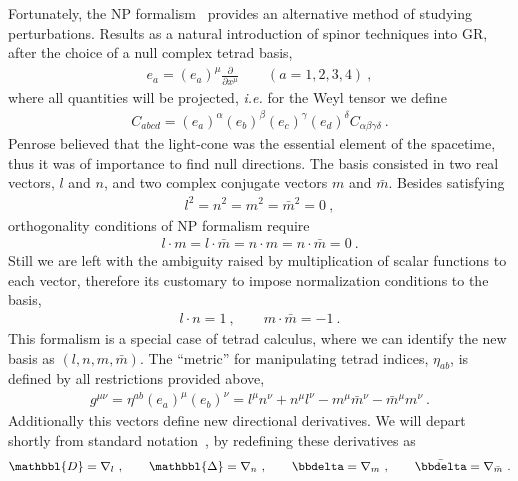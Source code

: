 Fortunately, the NP formalism~\cite{Newman1962} provides an alternative method of studying perturbations.
Results as a natural introduction of spinor techniques into GR, after the choice of a null complex tetrad basis,
\begin{align}
    e_a = (e_a)^\mu \frac{\partial}{\partial x^\mu} \qquad (a = 1, 2, 3, 4) ~,
\end{align}
where all quantities will be projected, \emph{i.e.} for the Weyl tensor we define
\begin{align}
    C_{abcd} =  (e_a)^\alpha  (e_b)^\beta  (e_c)^\gamma  (e_d)^\delta  C_{\alpha\beta\gamma\delta} ~.
\end{align}
Penrose believed that the light-cone was the essential element of the spacetime, thus it was of importance to find null directions. The basis consisted in two real vectors, $l$ and $n$, and two complex conjugate vectors $m$ and $\bar{m}$. Besides satisfying
\begin{align}
    l^2 = n^2 = m^2 = \bar{m}^2 = 0 ~,
\end{align}
orthogonality conditions of NP formalism require
\begin{align}
    l \cdot m = l \cdot \bar{m} = n \cdot m = n \cdot \bar{m} = 0 ~.
\end{align}
Still we are left with the ambiguity raised by multiplication of scalar functions to each vector, therefore its customary to impose normalization conditions to the basis,
\begin{align}
    l \cdot n = 1 ~, \qquad m \cdot \bar{m} = -1 ~.
\end{align}
This formalism is a special case of tetrad calculus, where we can identify the new basis as $(l,n,m,\bar{m})$. The ``metric'' for manipulating tetrad indices, $\eta_{ab}$, is defined by all restrictions provided above,
\begin{align}
    g^{\mu\nu} = \eta^{ab} (e_a)^\mu (e_b)^\nu = l^{\mu} n^{\nu} + n^{\mu} l^{\nu} - m^{\mu} \bar{m}^{\nu} - \bar{m}^{\mu} m^{\nu} ~.
\end{align}
Additionally this vectors define new directional derivatives.
We will depart shortly from standard notation~\cite{Teukolsky1972,Teukolsky1973,Teukolsky1974}, by redefining these derivatives as
\begin{align}
    \mathbbl{D}=\nabla_l ~,\qquad \mathbbl{\Delta}=\nabla_n ~,\qquad \bbdelta=\nabla_m ~,\qquad \bar{\bbdelta}=\nabla_{\bar{m}} ~.
    \label{eq3:tetradCovDer}
\end{align}

